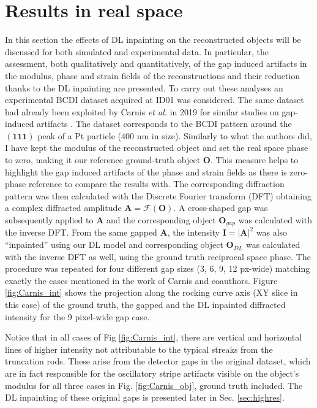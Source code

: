 \section{Results in real space}\label{sec:res_real}

In this section the effects of DL inpainting on the reconstructed objects will be discussed for both simulated and experimental 
data. In particular, the assessment, both qualitatively and quantitatively, of the gap induced artifacts in 
the modulus, phase and strain fields of the reconstructions and their reduction thanks to the DL inpainting are presented. To carry out
these analyses an experimental BCDI dataset acquired at ID01 was considered. The same dataset had already been exploited by 
Carnis \textit{et al.} in 2019 for similar studies on gap-induced artifacts \cite{carnis_towards_2019}. The dataset 
corresponds to the BCDI pattern around the $(\mathbf{111})$ peak of a Pt particle (400 nm in size). 
Similarly to what the authors did, I have kept the modulus of the reconstructed object and set the real space phase
to zero, making it our reference ground-truth object $\textbf{O}$. This measure helps to highlight the gap induced artifacts 
of the phase and strain fields as there is zero-phase 
reference to compare the results with. The corresponding diffraction pattern was then calculated with the Discrete
Fourier transform (DFT) obtaining a complex diffracted amplitude $\mathbf{A}=\mathcal{F}(\mathbf{O})$. A cross-shaped gap was 
subsequently applied to $\mathbf{A}$ and the corresponding object $\mathbf{O}_{gap}$ was calculated with the inverse DFT.
From the same gapped $\mathbf{A}$, the intensity $\mathbf{I} = |\mathbf{A}|^2$ was also ``inpainted'' using our DL model 
and corresponding object $\mathbf{O}_{DL}$ was calculated with the inverse DFT as well, using the ground truth reciprocal 
space phase. The procedure was repeated for four different gap sizes (3, 6, 9, 12 px-wide) matching exactly the cases 
mentioned in the work of Carnis and coauthors. Figure \ref{fig:Carnis_int} shows the projection along the rocking curve 
axis (XY slice in this case) of the ground truth, the gapped and the DL inpainted diffracted intensity for the 
9 pixel-wide gap case. 

Notice that in all cases of Fig \ref{fig:Carnis_int}, there are vertical and horizontal lines of higher intensity not attributable 
to the typical streaks from the truncation rods. These arise from the detector gaps in the original dataset, which are in 
fact responsible for the oscillatory stripe artifacts visible on the object's modulus for all three cases in Fig. 
\ref{fig:Carnis_obj}, ground truth included. The DL inpainting of these original gaps is presented later in Sec. \ref{sec:highres}. 

